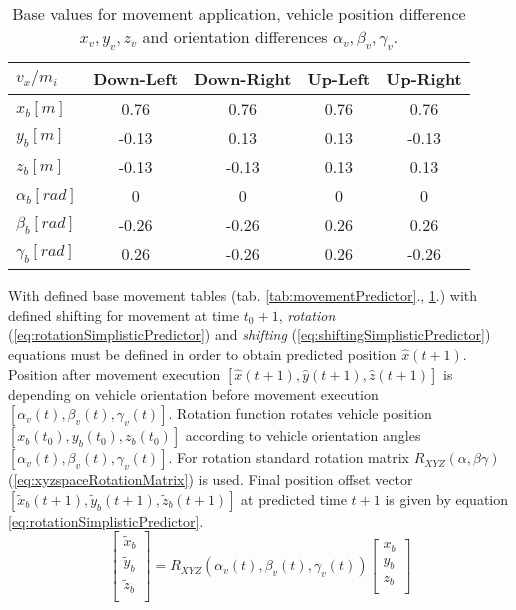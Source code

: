 \begin{table}[H]
    \centering
    \begin{tabular}{|l||c|c|c|c|}
    \hline
        $v_x/m_i$           & Down-Left & Down-Right & Up-Left  & Up-Right   \\\hline\hline
        $x_b [m]$           & 0.76  & 0.76  & 0.76 & 0.76  \\\hline
        $y_b [m]$           & -0.13	& 0.13	& 0.13 & -0.13 \\\hline
        $z_b [m]$           & -0.13 & -0.13 & 0.13 & 0.13  \\\hline
        $\alpha_b [rad]$	& 0	    & 0	    & 0    & 0     \\\hline
        $\beta_b [rad]$     & -0.26 & -0.26 & 0.26 & 0.26     \\\hline
        $\gamma_b [rad]$    & 0.26	& -0.26	& 0.26 & -0.26 \\\hline
    \end{tabular}
    \caption{Base values for movement application, vehicle position difference $x_v,y_v,z_v$ and orientation differences $\alpha_v,\beta_v,\gamma_v$.}
    \label{tab:movementPredictor2}
\end{table}
\noindent With defined base movement tables (tab. \ref{tab:movementPredictor}., \ref{tab:movementPredictor2}.) with defined shifting for movement at time $t_0+1$, \textit{rotation} (\ref{eq:rotationSimplisticPredictor}) and \textit{shifting} (\ref{eq:shiftingSimplisticPredictor}) equations must be defined in order to obtain predicted position $\hat{x}(t+1)$. Position after movement execution $[\hat{x}(t+1),\hat{y}(t+1),\hat{z}(t+1)]$ is depending on vehicle orientation before movement execution $[\alpha_v(t),\beta_v(t),\gamma_v(t)]$. Rotation function rotates vehicle position $[x_b(t_0),y_b(t_0),z_b(t_0)]$ according to vehicle orientation angles $[\alpha_v(t),\beta_v(t),\gamma_v(t)]$. For rotation standard rotation matrix $R_{XYZ}(\alpha,\beta\gamma)$ (\ref{eq:xyzspaceRotationMatrix}) is used. Final position offset vector $[\tilde{x}_b(t+1),\tilde{y}_b(t+1),\tilde{z}_b(t+1)]$ at predicted time $t+1$ is given by equation \ref{eq:rotationSimplisticPredictor}.
\begin{equation}\label{eq:rotationSimplisticPredictor}
    \begin{bmatrix}
        \tilde{x}_b\\ 
        \tilde{y}_b\\
        \tilde{z}_b\\
    \end{bmatrix}
    = R_{XYZ}(\alpha_v(t),\beta_v(t),\gamma_v(t))
    \begin{bmatrix}
        x_b\\ 
        y_b\\
        z_b\\
    \end{bmatrix}
\end{equation}
